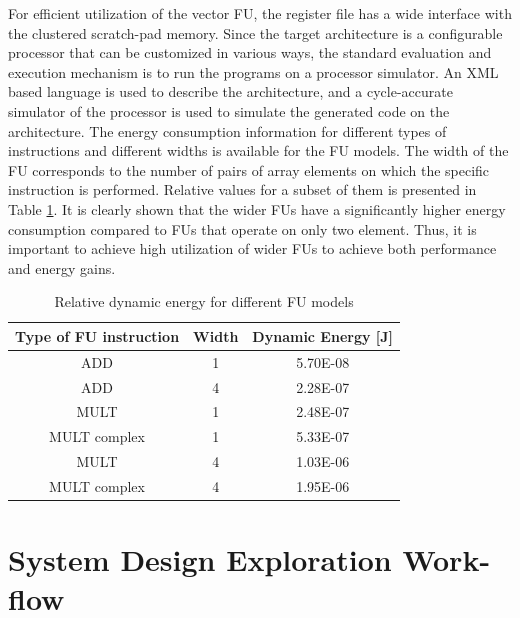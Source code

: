 For efficient utilization of the vector FU, the register file has a wide interface with the clustered scratch-pad memory. 
Since the target architecture is a configurable processor that can be customized in various ways, the standard evaluation and execution mechanism is to run the programs on a processor simulator. 
An XML based language is used to describe the architecture, and a cycle-accurate simulator of the processor is used to simulate the generated code on the architecture. 
The energy consumption information for different types of instructions and different widths is available for the FU models.
The width of the FU  corresponds to the number of pairs of array elements on which the specific instruction is performed.
Relative values for a subset of them is presented in Table \ref{tab:models2}. 
It is clearly shown that the wider FUs have a significantly higher energy consumption compared to FUs that operate on only two element.
Thus, it is important to achieve high utilization of wider FUs to achieve both performance and energy gains.

\begin{table}
\caption{Relative dynamic energy for different FU models}
\label{tab:models2}{
	\begin{tabular}{|c|c|c|}
		\hline
		\textbf{Type of FU instruction} & \textbf{Width} & \textbf{Dynamic Energy [J]} \\ 
		\hline 
		ADD  & 1 & 5.70E-08 \\ 
		\hline
		ADD  & 4 & 2.28E-07 \\ 
		\hline
		MULT  & 1 & 2.48E-07 \\ 
		\hline
	 	MULT complex  & 1 & 5.33E-07 \\ 
		\hline
		MULT  & 4 & 1.03E-06 \\ 
		\hline
		MULT complex  & 4 & 1.95E-06 \\ 
		\hline
		\end{tabular}}	
\end{table}

\section{System Design Exploration Work-flow}
\label{sec:methodologyD}

